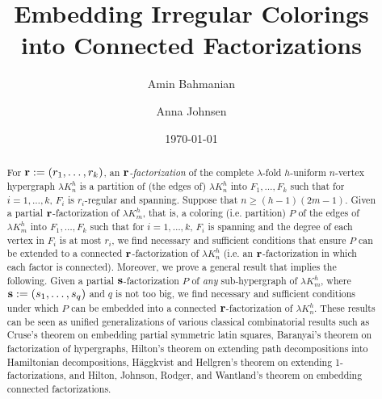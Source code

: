 \documentclass[12pt,oneside]{amsart}
\begin{document}
   \author{Amin Bahmanian}
   \address{Department of Mathematics,
  Illinois State University, Normal, IL USA 61790-4520}
   \author{Anna Johnsen}
  \address{Department of Mathematics,
  Illinois State University, Normal, IL USA 61790-4520}



\title[Embedding Irregular Colorings into Connected Factorizations]{Embedding Irregular Colorings into Connected Factorizations}

   \begin{abstract}  
For $\vb r:=(r_1,\dots,r_k)$, an {\it $\vb r$-factorization} of the complete $\lambda$-fold $h$-uniform $n$-vertex hypergraph $\lambda K_n^h$ is a partition of (the edges of) $\lambda K_n^h$ into $F_1,\dots, F_k$ such that for $i=1,\dots,k$,  $F_i$ is $r_i$-regular and spanning. Suppose that $n \geq (h-1)(2m-1)$. Given a partial $\vb r$-factorization of $\lambda K_m^h$, that is, a coloring (i.e. partition) $P$ of the edges of  $\lambda K_m^h$ into $F_1,\dots, F_k$ such that for $i=1,\dots,k$,  $F_i$ is  spanning and the degree of each vertex in $F_i$ is at most $r_i$, we find necessary and sufficient conditions that ensure $P$ can be extended to a connected $\vb r$-factorization of $\lambda K_n^h$ (i.e.  an $\vb r$-factorization in which each factor is connected). Moreover, we  prove a general result that implies the following. Given a partial $\vb s$-factorization $P$ of {\it any} sub-hypergraph of  $\lambda K_m^h$, where $\vb s:=(s_1,\dots,s_q)$ and $q$ is not too big, we find necessary and sufficient conditions under which $P$ can be embedded into  a connected $\vb r$-factorization of $\lambda K_n^h$. These results can be seen as  unified generalizations of various classical combinatorial results such as Cruse's theorem on embedding partial symmetric latin squares, Baranyai's theorem on factorization of hypergraphs, Hilton's theorem on extending path decompositions into Hamiltonian decompositions, H\"{a}ggkvist and Hellgren's theorem on extending 1-factorizations, and Hilton, Johnson, Rodger, and Wantland's theorem on embedding connected factorizations.

   \end{abstract}
   \date{\today}

   \maketitle   
 
\end{document}
